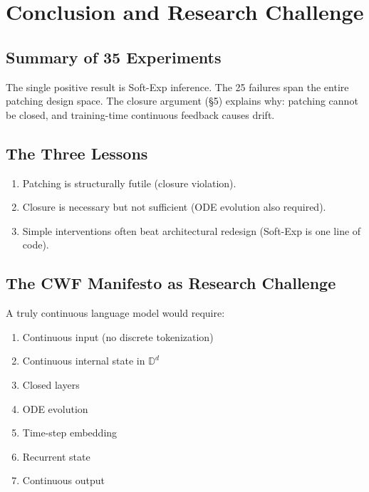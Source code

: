 \documentclass{article}
\begin{document}
\section{Conclusion and Research Challenge}

\subsection{Summary of 35 Experiments}

The single positive result is Soft-Exp inference. The 25 failures span the entire patching design space. The closure argument (§5) explains why: patching cannot be closed, and training-time continuous feedback causes drift.

\subsection{The Three Lessons}

\begin{enumerate}
    \item Patching is structurally futile (closure violation).
    \item Closure is necessary but not sufficient (ODE evolution also required).
    \item Simple interventions often beat architectural redesign (Soft-Exp is one line of code).
\end{enumerate}

\subsection{The CWF Manifesto as Research Challenge}

A truly continuous language model would require:
\begin{enumerate}
    \item Continuous input (no discrete tokenization)
    \item Continuous internal state in $\mathbb{D}^d$
    \item Closed layers
    \item ODE evolution
    \item Time-step embedding
    \item Recurrent state
    \item Continuous output
\end{enumerate}
\end{document}
